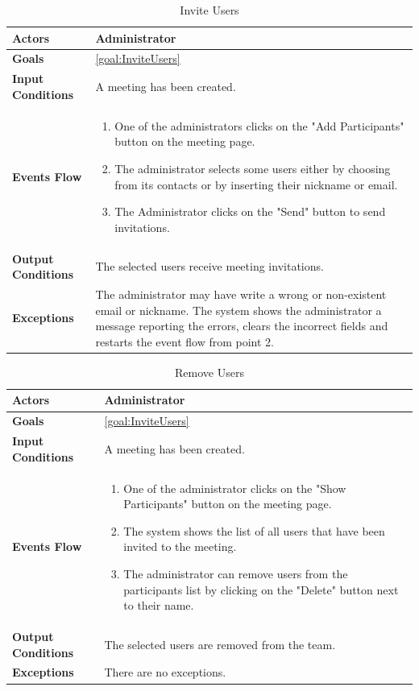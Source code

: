 \begin{table}[H]
	\centering
	\def\arraystretch{1.5}
	\begin{tabular}{|p{7cm}|p{7cm}|}
		\hline
		\textbf{Actors}            & Administrator    \\ \hline
		\textbf{Goals}             & \ref{goal:InviteUsers}           \\ \hline
		\textbf{Input Conditions}  & A meeting has been created.           \\ \hline
		\textbf{Events Flow}       &  
		\begin{enumerate}[topsep=0pt, leftmargin=*]
			\item One of the administrators clicks on the "Add Participants" button on the meeting page.
			\item The administrator selects some users either by choosing from its contacts or by inserting their nickname or email.
			\item The Administrator clicks on the "Send" button to send invitations.
		\end{enumerate}           \\ \hline
		\textbf{Output Conditions} & The selected users receive meeting invitations.            \\ \hline
		\textbf{Exceptions}        & 
		The administrator may have write a wrong or non-existent email or nickname. The system shows the administrator a message reporting the errors, clears the incorrect fields and restarts the event flow from point 2.     \\ \hline
	\end{tabular}
	\caption{Invite Users}
\end{table}

\begin{table}[H]
	\centering
	\def\arraystretch{1.5}
	\begin{tabular}{|p{7cm}|p{7cm}|}
		\hline
		\textbf{Actors}            & Administrator    \\ \hline
		\textbf{Goals}             & \ref{goal:InviteUsers}           \\ \hline
		\textbf{Input Conditions}  & A meeting has been created.           \\ \hline
		\textbf{Events Flow}       & 
		\begin{enumerate}[topsep=0pt, leftmargin=*]
			\item One of the administrator clicks on the "Show Participants" button on the meeting page.
			\item The system shows the list of all users that have been invited to the meeting.
			\item The administrator can remove users from the participants list by clicking on the "Delete" button next to their name.
		\end{enumerate}            \\ \hline
		\textbf{Output Conditions} & The selected users are removed from the team.            \\ \hline
		\textbf{Exceptions}        & 
		There are no exceptions.         \\ \hline
	\end{tabular}
	\caption{Remove Users}
\end{table}

